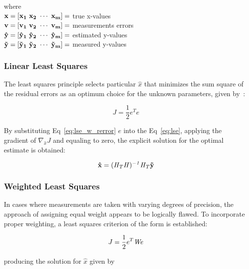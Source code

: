 where \\

$\bf{x} = \left[ x_{1} ~ x_{2} ~ \cdots ~ x_{m} \right] = $ true x-values \\

$\bf{v} = \left[ v_{1} ~ v_{2} ~ \cdots ~ v_{m} \right] = $ measurements errors \\

$\bf{\hat{y}} = \left[ \hat{y}_{1} ~ \hat{y}_{2} ~ \cdots ~ \hat{y}_{m} \right] = $ estimated y-values \\

$\bf{\tilde{y}} = \left[ \tilde{y}_{1} ~ \tilde{y}_{2} ~ \cdots ~ \tilde{y}_{m} \right] = $ measured y-values \\

\subsubsection{Linear Least Squares}
The least squares principle selects particular $\hat{x}$ that minimizes the sum square of the residual errors as an optimum choice for the unknown parameters, given by~\cite{crassidis2004dynamic}:

\begin{equation}
    J = \frac{1}{2} e^{T} e
    \label{eq:lse}
\end{equation}

By substituting Eq~\ref{eq:lse_w_rerror} $e$ into the Eq~\ref{eq:lse}, applying the gradient of $\nabla_{\hat{x}} J$ and equaling to zero, the explicit solution for the optimal estimate is obtained:

\begin{equation}
    \bf{\hat{x}} = (\it{H}_{T} \it{H})^{-1} \it{H}_{T} \bf{\tilde{y}}
\end{equation}


\subsubsection{Weighted Least Squares}
In cases where measurements are taken with varying degrees of precision, the approach of assigning equal weight appears to be logically flawed. To incorporate proper weighting, a least squares criterion of the form is established:

\begin{equation}
    J = \frac{1}{2} e^{T} \it{W} e
    \label{eq:wlse}
\end{equation}

producing the solution for $\hat{x}$ given by

